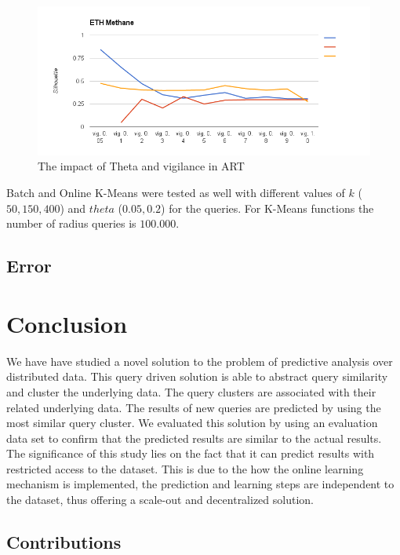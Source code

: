 \documentclass{lmproj}
\begin{document}
 \begin{figure}[ht]
	\centering
	\includegraphics[width=1.1\linewidth]{thetavigilance.png}
    \caption[ARTevaluation]{The impact of Theta and vigilance in ART}
\end{figure}

Batch and Online K-Means were tested as well with different values of $k$ ($50,150,400$) and $theta$ ($0.05,0.2$) for the queries. For K-Means functions the number of radius queries is $100.000$.



\section{Error}
\chapter{Conclusion}
We have have studied a novel solution to the problem of predictive analysis over distributed data. This query driven solution is able to abstract query similarity and cluster the underlying data. The query clusters are associated with their related underlying data. The results of new queries are predicted by using the most similar query cluster. We evaluated this solution by using an evaluation data set to confirm that the predicted results are similar to the actual results. The significance of this study lies on the fact that it can predict results with restricted access to the dataset. This is due to the how the online learning mechanism is implemented, the prediction and learning steps are independent to the dataset, thus offering a scale-out and decentralized solution. 

\section{Contributions}




\end{document}
